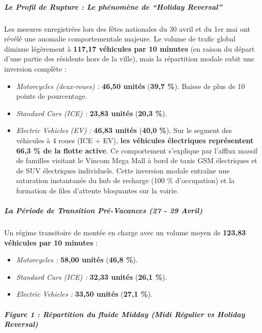 \documentclass[10pt, a4paper]{article}
\providecommand{\tightlist}{}
\begin{document}
\subparagraph{Le Profil de Rupture : Le phénomène de ``Holiday
Reversal''}\label{le-profil-de-rupture-le-phuxe9nomuxe8ne-de-holiday-reversal}

Les mesures enregistrées lors des fêtes nationales du 30 avril et du 1er
mai ont révélé une anomalie comportementale majeure. Le volume de trafic
global diminue légèrement à \textbf{117,17 véhicules par 10 minutes} (en
raison du départ d'une partie des résidents hors de la ville), mais la
répartition modale subit une inversion complète :

\begin{itemize}
\tightlist
\item
  \emph{Motorcycles (deux-roues) :} \textbf{46,50 unités} (\textbf{39,7
  \%}). Baisse de plus de 10 points de pourcentage.
\item
  \emph{Standard Cars (ICE) :} \textbf{23,83 unités} (\textbf{20,3 \%}).
\item
  \emph{Electric Vehicles (EV) :} \textbf{46,83 unités} (\textbf{40,0
  \%}). Sur le segment des véhicules à 4 roues (ICE + EV), \textbf{les
  véhicules électriques représentent 66,3 \% de la flotte active}. Ce
  comportement s'explique par l'afflux massif de familles visitant le
  Vincom Mega Mall à bord de taxis GSM électriques et de SUV électriques
  individuels. Cette inversion modale entraîne une saturation
  instantanée du hub de recharge (100 \% d'occupation) et la formation
  de files d'attente bloquantes sur la voirie.
\end{itemize}

\subparagraph{La Période de Transition Pré-Vacances (27 - 29
Avril)}\label{la-puxe9riode-de-transition-pruxe9-vacances-27---29-avril}

Un régime transitoire de montée en charge avec un volume moyen de
\textbf{123,83 véhicules par 10 minutes} :

\begin{itemize}
\tightlist
\item
  \emph{Motorcycles :} \textbf{58,00 unités} (\textbf{46,8 \%}).
\item
  \emph{Standard Cars (ICE) :} \textbf{32,33 unités} (\textbf{26,1 \%}).
\item
  \emph{Electric Vehicles :} \textbf{33,50 unités} (\textbf{27,1 \%}).
\end{itemize}

\subparagraph{Figure 1 : Répartition du fluide Midday (Midi Régulier vs
Holiday
Reversal)}\label{figure-1-ruxe9partition-du-fluide-midday-midi-ruxe9gulier-vs-holiday-reversal}
\end{document}
